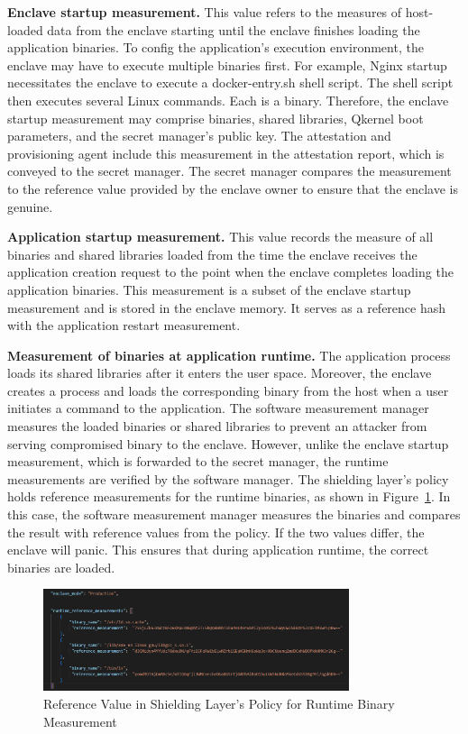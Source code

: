 \textbf{Enclave startup measurement.} This value refers to the measures of host-loaded data from the enclave starting until the enclave finishes loading the application binaries. To config the application's execution environment, the enclave may have to 
execute multiple binaries first. For example, Nginx startup necessitates the enclave to execute a docker-entry.sh shell script\cite*{nginx}. The shell script then executes several Linux commands. Each is a binary. Therefore, the enclave startup measurement may 
comprise binaries, shared libraries, Qkernel boot parameters, and the secret manager's public key. The attestation and provisioning agent include this measurement in the attestation report, which is conveyed to the secret manager. The secret manager 
compares the measurement to the reference value provided by the enclave owner to ensure that the enclave is genuine.

\textbf{Application startup measurement.} This value records the measure of all binaries and shared libraries loaded from the time the enclave receives the application creation request to the point when the enclave completes loading the application binaries. 
This measurement is a subset of the enclave startup measurement and is stored in the enclave memory. It serves as a reference hash with the application restart measurement.

\textbf{Measurement of binaries at application runtime.} The application process loads its shared libraries after it enters the user space. Moreover, the enclave creates a process and loads the corresponding binary from the host when a user initiates a 
command to the application. The software measurement manager measures the loaded binaries or shared libraries to prevent an attacker from serving compromised binary to the enclave. However, unlike the enclave startup measurement, which is forwarded 
to the secret manager, the runtime measurements are verified by the software manager. The shielding layer's policy holds reference measurements for the runtime binaries, as shown in Figure~\ref{fig:measurement}. In this case, the software measurement manager measures 
the binaries and compares the result with reference values from the policy. If the two values differ, the enclave will panic. This ensures that during application runtime, the correct binaries are loaded.

\begin{figure}[htp]
    \centering
    \includegraphics[width=0.8\textwidth]{images/measurement.png}
    \caption[Reference Value in Shielding Layer's Policy for Runtime Binary Measurement]{Reference Value in Shielding Layer's Policy for Runtime Binary Measurement}
    \label{fig:measurement}
\end{figure}


